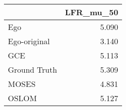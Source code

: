 \begin{tabular}{lr}
\toprule
{} & LFR_mu_50 \\
\midrule
Ego          &     5.090 \\
Ego-original &     3.140 \\
GCE          &     5.113 \\
Ground Truth &     5.309 \\
MOSES        &     4.831 \\
OSLOM        &     5.127 \\
\bottomrule
\end{tabular}
